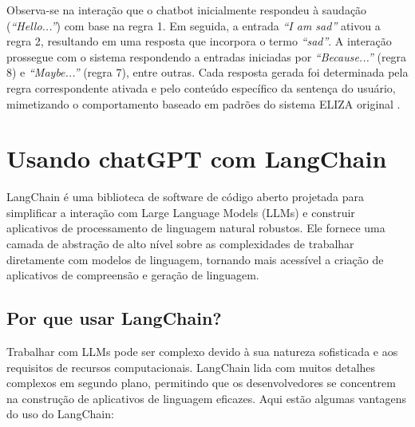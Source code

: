 \documentclass[14pt,a4paper,oneside]{book}
\begin{document}
Observa-se na interação que o chatbot inicialmente respondeu à saudação (\textit{``Hello...''}) com base na regra 1. Em seguida, a entrada \textit{``I am sad''} ativou a regra 2, resultando em uma resposta que incorpora o termo \textit{``sad''}. A interação prossegue com o sistema respondendo a entradas iniciadas por \textit{``Because...''} (regra 8) e \textit{``Maybe...''} (regra 7), entre outras. Cada resposta gerada foi determinada pela regra correspondente ativada e pelo conteúdo específico da sentença do usuário, mimetizando o comportamento baseado em padrões do sistema ELIZA original \cite{Abdul-Kader2015}.


\chapter{Usando chatGPT com LangChain}

LangChain é uma biblioteca de software de código aberto projetada para simplificar a interação com Large Language Models (LLMs) e construir aplicativos de processamento de linguagem natural robustos. Ele fornece uma camada de abstração de alto nível sobre as complexidades de trabalhar diretamente com modelos de linguagem, tornando mais acessível a criação de aplicativos de compreensão e geração de linguagem.

\section{Por que usar LangChain?}

Trabalhar com LLMs pode ser complexo devido à sua natureza sofisticada e aos requisitos de recursos computacionais. LangChain lida com muitos detalhes complexos em segundo plano, permitindo que os desenvolvedores se concentrem na construção de aplicativos de linguagem eficazes. Aqui estão algumas vantagens do uso do LangChain:
\end{document}
